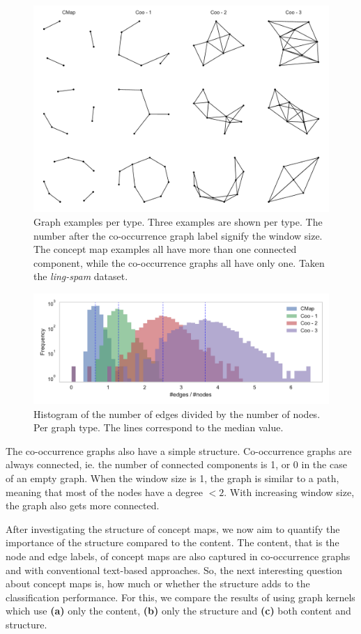 \begin{figure}[ht]
\centering
\includegraphics[width=0.6\linewidth]{assets/figures/graph-examples.pdf}
\caption{Graph examples per type. Three examples are shown per type. The number after the co-occurrence graph label signify the window size. The concept map examples all have more than one connected component, while the co-occurrence graphs all have only one. Taken the \textit{ling-spam} dataset.}\label{fig:graph_examples}
\end{figure}

\begin{figure}[ht]
\centering
\includegraphics[width=0.7\linewidth]{assets/figures/hist-edgesnodes.pdf}
\caption{Histogram of the number of edges divided by the number of nodes. Per graph type. The lines correspond to the median value.}
\label{fig:histogram-edges-div-nodes-per-type}
\end{figure}

The co-occurrence graphs also have a simple structure.
Co-occurrence graphs are always connected, ie. the number of connected components is 1, or 0 in the case of an empty graph.
When the window size is 1, the graph is similar to a path, meaning that most of the nodes have a degree $< 2$. With increasing window size, the graph also gets more connected.

After investigating the structure of concept maps, we now aim to quantify the importance of the structure compared to the content.
The content, that is the node and edge labels, of concept maps are also captured in co-occurrence graphs and with conventional text-based approaches. So, the next interesting question about concept maps is, how much or whether the structure adds to the classification performance.
For this, we compare the results of using graph kernels which use \textbf{(a)} only the content, \textbf{(b)} only the structure and \textbf{(c)} both content and structure.

